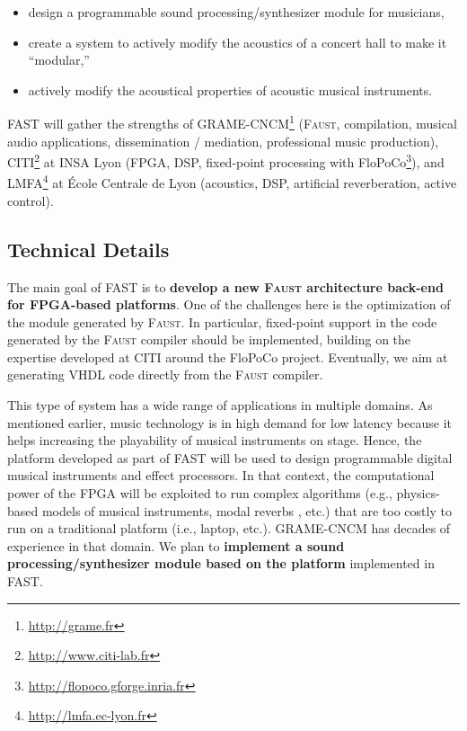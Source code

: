 \documentclass[a4paper,10pt]{article}
\newcommand{\F}{\textsc{Faust}}
\newcommand{\PP}{FAST}
\begin{document}
\begin{itemize}
  \itemsep0em
  \item design a programmable sound processing/synthesizer module for musicians, 
  \item create a system to actively modify the acoustics of a concert hall to make it ``modular,''
  \item actively modify the acoustical properties of acoustic musical instruments. 
\end{itemize}

\PP{} will gather the strengths of GRAME-CNCM\footnote{\url{http://grame.fr}} (\F{}, compilation, musical audio applications, dissemination / mediation, professional music production), CITI\footnote{\url{http://www.citi-lab.fr}} at INSA Lyon (FPGA, DSP, fixed-point processing with FloPoCo\footnote{\url{http://flopoco.gforge.inria.fr}}), and LMFA\footnote{\url{http://lmfa.ec-lyon.fr}} at École Centrale de Lyon (acoustics, DSP, artificial reverberation, active control). 

\subsection*{Technical Details}

The main goal of \PP{} is to \textbf{develop a new \F{} architecture back-end for FPGA-based platforms}. One of the challenges here is the optimization of the module generated by \F{}. In particular, fixed-point support in the code generated by the \F{} compiler should be implemented, building on the expertise developed at CITI around the FloPoCo project. Eventually, we aim at generating VHDL code directly from the \F{} compiler. 

This type of system has a wide range of applications in multiple domains. As mentioned earlier, music technology is in high demand for low latency because it helps increasing the playability of musical instruments on stage. Hence, the platform developed as part of \PP{} will be used to design programmable digital musical instruments and effect processors. In that context, the computational power of the FPGA will be exploited to run complex algorithms (e.g., physics-based models of musical instruments, modal reverbs \cite{Abel2009}, etc.) that are too costly to run on a traditional platform (i.e., laptop, etc.). GRAME-CNCM has decades of experience in that domain. We plan to \textbf{implement a sound processing/synthesizer module based on the platform} implemented in \PP{}.
\end{document}
